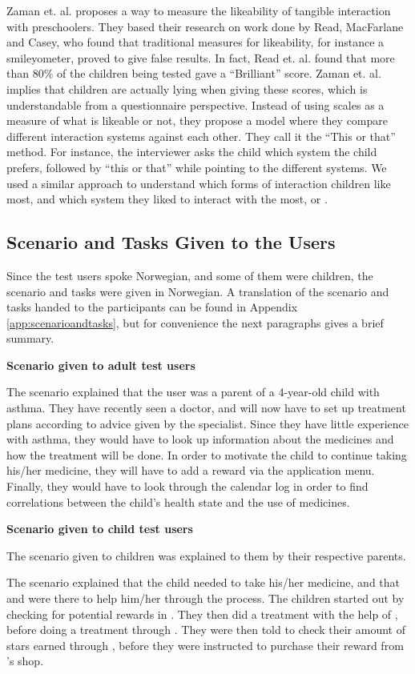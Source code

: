 Zaman et. al. proposes a way to measure the likeability of tangible interaction with preschoolers\cite{zaman2007measure}. They based their research on work done by Read, MacFarlane and Casey\cite{read2002endurability}, who found that traditional measures for likeability, for instance a smileyometer, proved to give false results. In fact, Read et. al. found that more than 80\% of the children being tested gave a ``Brilliant'' score. Zaman et. al. implies that children are actually lying when giving these scores, which is understandable from a questionnaire perspective. Instead of using scales as a measure of what is likeable or not, they propose a model where they compare different interaction systems against each other. They call it the ``This or that'' method\cite{zaman2007measure}. For instance, the interviewer asks the child which system the child prefers, followed by ``this or that'' while pointing to the different systems. We used a similar approach to understand which forms of interaction children like most, and which system they liked to interact with the most, \app{} or \ab{}.   


\subsection{Scenario and Tasks Given to the Users}
\label{sec:scenarioandtasksgiventotheusers}
Since the test users spoke Norwegian, and some of them were children, the scenario and tasks were given in Norwegian. A translation of the scenario and tasks handed to the participants can be found in Appendix \ref{app:scenarioandtasks}, but for convenience the next paragraphs gives a brief summary.

\textbf{Scenario given to adult test users}

The scenario explained that the user was a parent of a 4-year-old child with asthma. They have recently seen a doctor, and will now have to set up treatment plans according to advice given by the specialist. Since they have little experience with asthma, they would have to look up information about the medicines and how the treatment will be done. In order to motivate the child to continue taking his/her medicine, they will have to add a reward via the application menu. Finally, they would have to look through the calendar log in order to find correlations between the child's health state and the use of medicines. 


\textbf{Scenario given to child test users}

The scenario given to children was explained to them by their respective parents.

The scenario explained that the child needed to take his/her medicine, and that \app{} and \ab{} were there to help him/her through the process. The children started out by checking for potential rewards in \app{}. They then did a treatment with the help of \ab{}, before doing a treatment through \app{}. They were then told to check their amount of stars earned through \ab{}, before they were instructed to purchase their reward from \app{}'s shop.     
